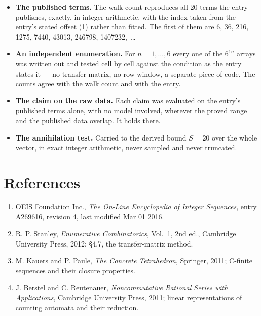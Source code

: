 \documentclass[11pt]{article}
\theoremstyle{definition}
\begin{document}
\begin{itemize}

\item {\bfseries The published terms.} The walk count reproduces all 20 terms the entry publishes, exactly, in integer arithmetic, with the index taken from the entry's stated offset (1) rather than fitted. The first of them are 6, 36, 216, 1275, 7440, 43013, 246798, 1407232,~\dots

\item {\bfseries An independent enumeration.} For $n = 1,\dots,6$ every one of the $6^{1n}$ arrays was written out and tested cell by cell against the condition as the entry states it --- no transfer matrix, no row window, a separate piece of code. The counts agree with the walk count and with the entry.

\item {\bfseries The claim on the raw data.} Each claim was evaluated on the entry's published terms alone, with no model involved, wherever the proved range and the published data overlap. It holds there.

\item {\bfseries The annihilation test.} Carried to the derived bound $S = 20$ over the whole vector, in exact integer arithmetic, never sampled and never truncated.

\end{itemize}

\section{References}

\begin{enumerate}

\item OEIS Foundation Inc., \emph{The On-Line Encyclopedia of Integer Sequences}, entry \href{https://oeis.org/A269616}{A269616}, revision 4, last modified Mar 01 2016.

\item R. P. Stanley, \emph{Enumerative Combinatorics}, Vol.~1, 2nd ed., Cambridge University Press, 2012; \S4.7, the transfer-matrix method.

\item M. Kauers and P. Paule, \emph{The Concrete Tetrahedron}, Springer, 2011; C-finite sequences and their closure properties.

\item J. Berstel and C. Reutenauer, \emph{Noncommutative Rational Series with Applications}, Cambridge University Press, 2011; linear representations of counting automata and their reduction.

\end{enumerate}
\end{document}
